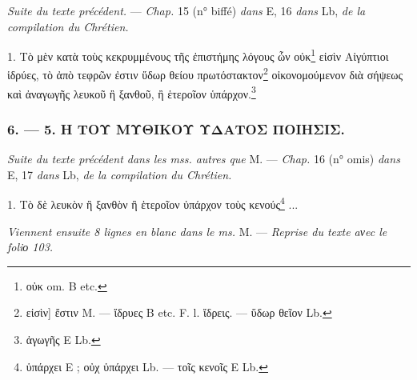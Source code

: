\documentclass[a4paper, 11pt, oneside, polutonikogreek, french]{article}
\begin{document}
\emph{Suite du texte précédent.} --- \emph{Chap.} 15 (n° biffé) \emph{dans} E, 16 \emph{dans} Lb, \emph{de la compilation du Chrétien.}

1. Τὸ μὲν κατὰ τοὺς κεκρυμμένους τῆς ἐπιστήμης λόγους ὧν οὐκ\footnote{οὐκ om. B etc.} εἰσὶν Αἰγύπτιοι ἱδρύες, τὸ ἀπὸ τεφρῶν ἐστιν ὕδωρ θείου πρωτόστακτον\footnote{εἰσὶν] ἔστιν M. --- ἴδρυες B etc. F. l. ἴδρεις. --- ὕδωρ θεῖον Lb.} οἰκονομούμενον διὰ σήψεως καὶ ἀναγωγῆς λευκοῦ ἢ ξανθοῦ, ἢ ἑτεροῖον ὑπάρχον.\footnote{ἀγωγῆς E Lb.}

\bigskip
\centerline{\EightStarTaper}
\centerline{\EightStarTaper\EightStarTaper}
\bigskip

\subsubsection{6. --- 5. Η ΤΟΥ ΜΥΘΙΚΟΥ ΥΔΑΤΟΣ ΠΟΙΗΣΙΣ.}

\emph{Suite du texte précédent dans les mss. autres que} M. --- \emph{Chap.} 16 (n° omis) \emph{dans} E, 17 \emph{dans} Lb, \emph{de la compilation du Chrétien.}

1. Τὸ δὲ λευκὸν ἢ ξανθὸν ἢ ἑτεροῖον ὑπάρχον τοὺς κενούς\footnote{ὑπάρχει E ; οὐχ ὑπάρχει Lb. --- τοῖς κενοῖς E Lb.} ...

\emph{Viennent ensuite 8 lignes en blanc dans le ms.} M. --- \emph{Reprise du texte aνec le foliο 103.}
\end{document}
